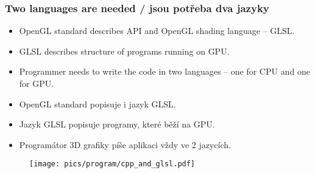 
\begin{frame}\frametitle{Two languages are needed / jsou potřeba dva jazyky}
\scriptsize
\begin{itemize}
  \item OpenGL standard describes API and OpenGL shading language -- GLSL.
  \item GLSL describes structure of programs running on GPU.
  \item Programmer needs to write the code in two languages -- one for CPU and one for GPU.
\end{itemize}

\begin{itemize}
  \item OpenGL standard popisuje i jazyk GLSL.
  \item Jazyk GLSL popisuje programy, které běží na GPU.
  \item Programátor 3D grafiky píše aplikaci vždy ve 2 jazycích.
\end{itemize}
  \begin{figure}[h]
    \texttt{[image: pics/program/cpp\_and\_glsl.pdf]}
  \end{figure}
\end{frame}

